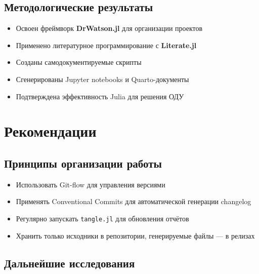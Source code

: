 \documentclass[
  letterpaper,
  DIV=11,
  numbers=noendperiod]{scrartcl}
\providecommand{\tightlist}{%
  \setlength{\itemsep}{0pt}\setlength{\parskip}{0pt}}\usepackage{longtable,booktabs,array}
\begin{document}
\subsection{Методологические
результаты}\label{ux43cux435ux442ux43eux434ux43eux43bux43eux433ux438ux447ux435ux441ux43aux438ux435-ux440ux435ux437ux443ux43bux44cux442ux430ux442ux44b}

\begin{itemize}
\tightlist
\item
  Освоен фреймворк \textbf{DrWatson.jl} для организации проектов
\item
  Применено литературное программирование с \textbf{Literate.jl}
\item
  Созданы самодокументируемые скрипты
\item
  Сгенерированы Jupyter notebooks и Quarto-документы
\item
  Подтверждена эффективность Julia для решения ОДУ
\end{itemize}

\section{Рекомендации}\label{ux440ux435ux43aux43eux43cux435ux43dux434ux430ux446ux438ux438}

\subsection{Принципы организации
работы}\label{ux43fux440ux438ux43dux446ux438ux43fux44b-ux43eux440ux433ux430ux43dux438ux437ux430ux446ux438ux438-ux440ux430ux431ux43eux442ux44b}

\begin{itemize}
\tightlist
\item
  Использовать Git-flow для управления версиями
\item
  Применять Conventional Commits для автоматической генерации changelog
\item
  Регулярно запускать \texttt{tangle.jl} для обновления отчётов
\item
  Хранить только исходники в репозитории, генерируемые файлы --- в
  релизах
\end{itemize}

\subsection{Дальнейшие
исследования}\label{ux434ux430ux43bux44cux43dux435ux439ux448ux438ux435-ux438ux441ux441ux43bux435ux434ux43eux432ux430ux43dux438ux44f}
\end{document}
